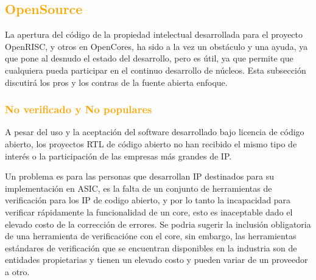 \documentclass[a4paper,11pt]{article}
\begin{document}



		

		\subsection{\textcolor{orange}{ OpenSource}}

La apertura del código de la propiedad intelectual desarrollada para el proyecto OpenRISC, y otros en OpenCores, ha sido a la vez un obstáculo y una ayuda, ya que pone al desnudo el estado del desarrollo, pero es útil, ya que permite que cualquiera pueda participar en el continuo desarrollo de núcleos. Esta subsección discutirá los pros y los contras de la fuente abierta enfoque.

		\subsubsection{\textcolor{orange}{No verificado y No populares}} 

A pesar del uso y la aceptación del software desarrollado bajo licencia de código abierto, los proyectos RTL de código abierto no han recibido el mismo tipo de interés o la participación de las empresas más grandes de IP. 

Un problema es para las personas que desarrollan IP destinados para su implementación en ASIC, es la falta de un conjunto de herramientas de verificación para los IP de codigo abierto, y por lo tanto la incapacidad para verificar rápidamente la funcionalidad de un core, esto es inaceptable dado el elevado costo de la corrección de errores. Se podria sugerir la inclusión obligatoria de una herramienta de verificacióne con el core, sin embargo, las herramientas estándares de verificación que se encuentran disponibles en la industria son de entidades propietarias y tienen un elevado costo y pueden variar de un proveedor a otro. 
\end{document}
